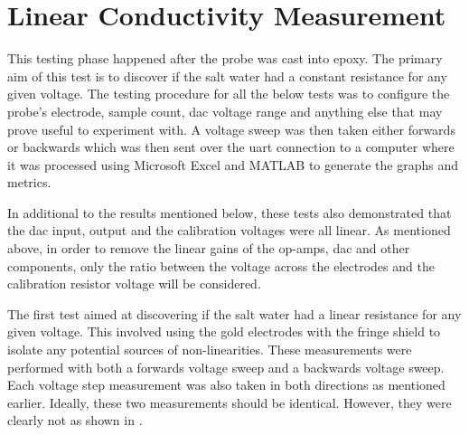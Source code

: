 \section{Linear Conductivity Measurement}\label{sec:linear-conductivity-measurement}

This testing phase happened after the probe was cast into epoxy.
The primary aim of this test is to discover if the salt water had a constant resistance for any given voltage.
The testing procedure for all the below tests was to configure the probe's electrode, sample count, \gls{dac} voltage range and anything else that may prove useful to experiment with.
A voltage sweep was then taken either forwards or backwards which was then sent over the \gls{uart} connection to a computer where it was processed using Microsoft Excel and MATLAB to generate the graphs and metrics.

In additional to the results mentioned below, these tests also demonstrated that the \gls{dac} input, output and the calibration voltages were all linear.
As mentioned above, in order to remove the linear gains of the op-amps, \gls{dac} and other components, only the ratio between the voltage across the electrodes and the calibration resistor voltage will be considered.

The first test aimed at discovering if the salt water had a linear resistance for any given voltage.
This involved using the gold electrodes with the fringe shield to isolate any potential sources of non-linearities.
These measurements were performed with both a forwards voltage sweep and a backwards voltage sweep.
Each voltage step measurement was also taken in both directions as mentioned earlier.
Ideally, these two measurements should be identical.
However, they were clearly not as shown in .

